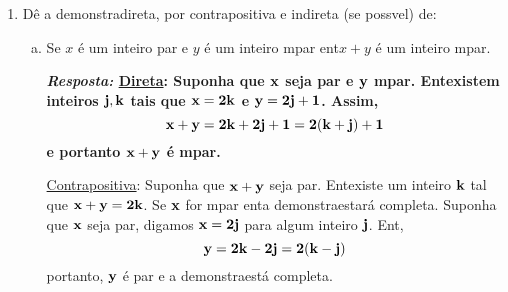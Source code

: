 \begin{enumerate}[{\bf 1.}]
\begin{enumerate}[a)]
\item ``Demonstra'': Suponha que $x-y$ seja \ih mpar, digamos $x-y=2j+1$ para algum inteiro $j$. Se $x$ \'e \ih mpar o teorema estar\'a demonstrado. Portanto, assuma que $x$ seja par, digamos $x=2k$ para algum inteiro $k$. Ent\aoi,
\[
y=x-(x-y)=2k-(2j+1)=2(k-j)-1=2(k-j-1)+1
\]
logo, $y$ \'e \ih mpar e o teorema est\'a demonstrado.
\item ``Demonstra'': Suponha que $x$ e $y$ sejam ambos pares. Ent\ao existem inteiros $j,k$ tais que $x=2j$ e $y=2k$. Assim,
\[
x-y=2j-2k=2(j-k)
\]
portanto, $x-y$ \'e par.
\item ``Demonstra'': Suponha que $x-y$ seja par. Ent\ao se $x$ for \ih mpar, o teorema estar\'a demonstrado. Logo, suponha que $x$ seja par. Ent\ao existem inteiros $j,k$ tais que $x-y=2j$ e $x=2k$. Assim, 
\[
y=x-(x-y)=2k-2j=2(k-j)
\]
logo, $y$ tamb\'em \'e par.
\item ``Demonstra'': Suponha que $x-y$ seja \ih mpar, digamos $x-y=2j+1$ para algum inteiro $j$. Ent\ao se $x$ \'e \ih mpar, digamos $x=2k+1$ para algum $k$, teremos
\[
y=x-(x-y)=2k+1-(2j+1)=2(k-j)
\]
logo $y$ \'e par e a demonstra\cao est\'a completa.
\item ``Demonstra'': Suponha que $x$ e $y$ sejam \ih mpares e $x-y$ \ih mpar tamb\'em. Ent\ao existem inteiros $j,k$ tais que $x=2j+1$ e $y=2k+1$. Assim,
\[
x-y=2j+1-(2k+1)=2(j-k)
\]
logo, $x-y$ \'e \ih mpar e par, uma contradi\caoi.
\end{enumerate}

\item D\^e a demonstra\cao direta, por contrapositiva e indireta (se poss\ih vel) de:
\begin{enumerate}[a)]
\item Se $x$ \'e um inteiro par e $y$ \'e um inteiro \ih mpar ent\ao $x+y$ \'e um inteiro \ih mpar. 

{\bf{\it Resposta:} \underline{Direta}: Suponha que ${\bf x}$ seja par e ${\bf y}$ \ih mpar. Ent\ao existem inteiros ${\bf j,k}$ tais que ${\bf x=2k}$ e ${\bf y=2j+1}$. Assim,
\[
{\bf x+y=2k+2j+1=2(k+j)+1}
\]
e portanto ${\bf x+y}$ \'e \ih mpar.

\noindent \underline{Contrapositiva}: Suponha que ${\bf x+y}$ seja par. Ent\ao existe um inteiro ${\bf k}$ tal que ${\bf x+y=2k}$. Se ${\bf x}$ for \ih mpar ent\ao a demonstra\cao estar\'a completa. Suponha que ${\bf x}$ seja par, digamos ${\bf x=2j}$ para algum inteiro ${\bf j}$. Ent\aoi,
\[
{\bf y=2k-2j=2(k-j)}
\]
portanto, ${\bf y}$ \'e par e a demonstra\cao est\'a completa.

}
\end{enumerate}
\end{enumerate}
